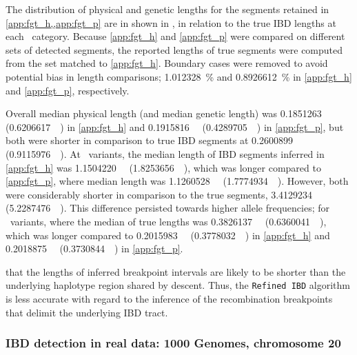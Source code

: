 %

%

The distribution of physical and genetic lengths for the segments retained in \cref{app:fgt_h,,app:fgt_p} are in shown in , in relation to the true IBD lengths at each \fk{}~category.
Because \ref{app:fgt_h} and \ref{app:fgt_p} were compared on different sets of detected segments, the reported lengths of true segments were computed from the set matched to \ref{app:fgt_h}.
Boundary cases were removed to avoid potential bias in length comparisons; \SI{1.012328}{\percent} and \SI{0.8926612}{\percent} in \ref{app:fgt_h} and \ref{app:fgt_p}, respectively.

Overall median physical length (and median genetic length) was
\SI{0.1851263}{\mega\basepair} (\SI{0.6206617}{\centi\morgan}) in \ref{app:fgt_h} and
\SI{0.1915816}{\mega\basepair} (\SI{0.4289705}{\centi\morgan}) in \ref{app:fgt_p}, but both were shorter in comparison to true IBD segments at \SI{0.2600899}{\mega\basepair} (\SI{0.9115976}{\centi\morgan}).
At ~variants, the median length of IBD segments inferred in \ref{app:fgt_h} was \SI{1.1504220}{\mega\basepair} (\SI{1.8253656}{\centi\morgan}), which was longer compared to \ref{app:fgt_p}, where median length was \SI{1.1260528}{\mega\basepair} (\SI{1.7774934}{\centi\morgan}).
However, both were considerably shorter in comparison to the true segments, \SI{3.4129234}{\mega\basepair} (\SI{5.2287476}{\centi\morgan}).
This difference persisted towards higher allele frequencies; \eg for ~variants, where the median of true lengths was
\SI{0.3826137}{\mega\basepair} (\SI{0.6360041}{\centi\morgan}), which was
longer compared to \SI{0.2015983}{\mega\basepair} (\SI{0.3778032}{\centi\morgan}) in \ref{app:fgt_h} and \SI{0.2018875}{\mega\basepair} (\SI{0.3730844}{\centi\morgan}) in \ref{app:fgt_p}.


 that the lengths of inferred breakpoint intervals are likely to be shorter than the underlying haplotype region shared by descent.
Thus, the \texttt{Refined\,IBD} algorithm is less accurate with regard to the inference of the recombination breakpoints that delimit the underlying IBD tract.



%
\subsubsection{IBD detection in real data: 1000 Genomes, chromosome 20}
%

